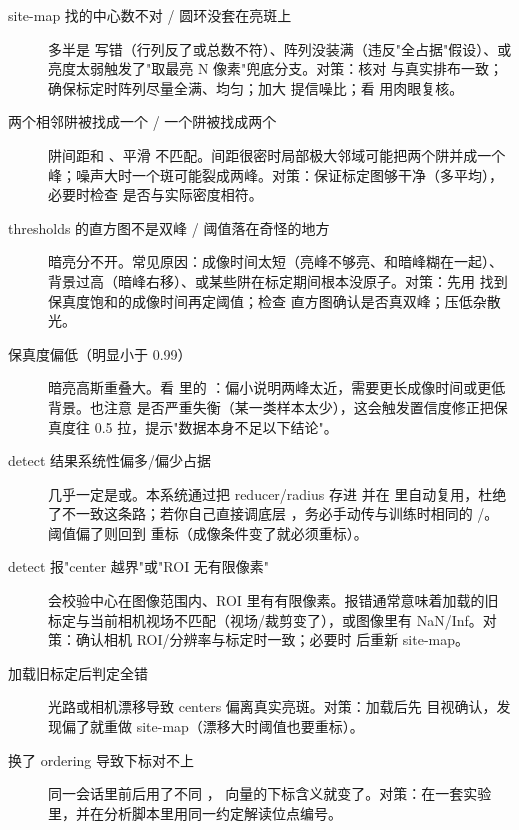 \documentclass[11pt,oneside,openany]{book}
\begin{document}
\begin{description}

\item[site-map 找的中心数不对 / 圆环没套在亮斑上] 多半是  写错（行列反了或总数不符）、阵列没装满（违反"全占据"假设）、或亮度太弱触发了"取最亮 N 像素"兜底分支。对策：核对  与真实排布一致；确保标定时阵列尽量全满、均匀；加大  提信噪比；看  用肉眼复核。

\item[两个相邻阱被找成一个 / 一个阱被找成两个] 阱间距和 、平滑  不匹配。间距很密时局部极大邻域可能把两个阱并成一个峰；噪声大时一个斑可能裂成两峰。对策：保证标定图够干净（多平均），必要时检查  是否与实际密度相符。

\item[thresholds 的直方图不是双峰 / 阈值落在奇怪的地方] 暗亮分不开。常见原因：成像时间太短（亮峰不够亮、和暗峰糊在一起）、背景过高（暗峰右移）、或某些阱在标定期间根本没原子。对策：先用  找到保真度饱和的成像时间再定阈值；检查  直方图确认是否真双峰；压低杂散光。

\item[保真度偏低（明显小于 0.99）] 暗亮高斯重叠大。看  里的 ：偏小说明两峰太近，需要更长成像时间或更低背景。也注意  是否严重失衡（某一类样本太少），这会触发置信度修正把保真度往 0.5 拉，提示"数据本身不足以下结论"。

\item[detect 结果系统性偏多/偏少占据] 几乎一定是或。本系统通过把 reducer/radius 存进  并在  里自动复用，杜绝了不一致这条路；若你自己直接调底层 ，务必手动传与训练时相同的 /。阈值偏了则回到  重标（成像条件变了就必须重标）。

\item[detect 报"center 越界"或"ROI 无有限像素"]  会校验中心在图像范围内、ROI 里有有限像素。报错通常意味着加载的旧标定与当前相机视场不匹配（视场/裁剪变了），或图像里有 NaN/Inf。对策：确认相机 ROI/分辨率与标定时一致；必要时  后重新 site-map。

\item[加载旧标定后判定全错] 光路或相机漂移导致 centers 偏离真实亮斑。对策：加载后先  目视确认，发现偏了就重做 site-map（漂移大时阈值也要重标）。

\item[换了 ordering 导致下标对不上] 同一会话里前后用了不同 ， 向量的下标含义就变了。对策：在一套实验里，并在分析脚本里用同一约定解读位点编号。

\end{description}
\end{document}
